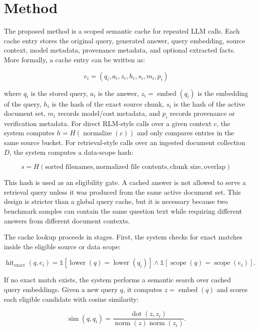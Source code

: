 \documentclass[10pt,a4paper]{article}
\begin{document}
\section{Method}

The proposed method is a scoped semantic cache for repeated LLM calls. Each cache entry stores the original query, generated answer, query embedding, source context, model metadata, provenance metadata, and optional extracted facts. More formally, a cache entry can be written as:

\[
e_i = (q_i, a_i, z_i, h_i, s_i, m_i, p_i)
\]

where $q_i$ is the stored query, $a_i$ is the answer, $z_i = \operatorname{embed}(q_i)$ is the embedding of the query, $h_i$ is the hash of the exact source chunk, $s_i$ is the hash of the active document set, $m_i$ records model/cost metadata, and $p_i$ records provenance or verification metadata. For direct RLM-style calls over a given context $c$, the system computes $h = H(\operatorname{normalize}(c))$ and only compares entries in the same source bucket. For retrieval-style calls over an ingested document collection $D$, the system computes a data-scope hash:

\[
s = H(\text{sorted filenames}, \text{normalized file contents}, \text{chunk size}, \text{overlap})
\]

This hash is used as an eligibility gate. A cached answer is not allowed to serve a retrieval query unless it was produced from the same active document set. This design is stricter than a global query cache, but it is necessary because two benchmark samples can contain the same question text while requiring different answers from different document contexts.

The cache lookup proceeds in stages. First, the system checks for exact matches inside the eligible source or data scope:

\[
\operatorname{hit}_{\operatorname{exact}}(q, e_i)
= \mathbb{1}\!\left[\operatorname{lower}(q) = \operatorname{lower}(q_i)\right]
\land
\mathbb{1}\!\left[\operatorname{scope}(q) = \operatorname{scope}(e_i)\right].
\]

If no exact match exists, the system performs a semantic search over cached query embeddings. Given a new query $q$, it computes $z = \operatorname{embed}(q)$ and scores each eligible candidate with cosine similarity:

\[
\operatorname{sim}(q, q_i) =
\frac{\operatorname{dot}(z, z_i)}
{\operatorname{norm}(z)\operatorname{norm}(z_i)}.
\]
\end{document}
